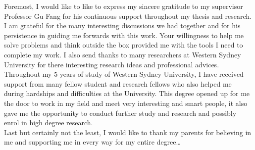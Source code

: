 \documentclass[
12pt, %
english, %
onehalfspacing, %
headsepline, %
]{MastersDoctoralThesis} %
\begin{document}
\begin{acknowledgements}
\addchaptertocentry{\acknowledgementname} %
\hspace{5mm} Foremost, I would like to like to express my sincere gratitude to my supervisor Professor Gu Fang for his continuous support throughout my thesis and research. I am grateful for the many interesting discussions we had together and for his persistence in guiding me forwards with this work. Your willingness to help me solve problems and think outside the box provided me with the tools I need to complete my work. I also send thanks to many researchers at Western Sydney University for there interesting research ideas and professional advices.\\

Throughout my 5 years of study of Western Sydney University, I have received support from many fellow student and research fellows who also helped me during hardships and difficulties at the University. This degree opened up for me the door to work in my field and meet very interesting and smart people, it also gave me the opportunity to conduct further study and research and possibly enrol in high degree research.\\

Last but certainly not the least, I would like to thank my parents for believing in me and supporting me in every way for my entire degree\ldots
\end{acknowledgements}


\tableofcontents %

\listoffigures %

\listoftables %

\end{document}
